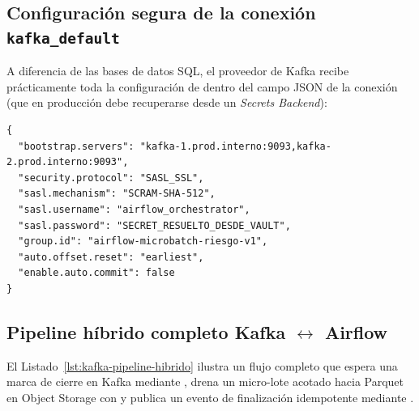 \subsection{Configuración segura de la conexión \texttt{kafka\_default}}

A diferencia de las bases de datos SQL, el proveedor de Kafka recibe prácticamente toda la configuración de  dentro del campo JSON  de la conexión (que en producción debe recuperarse desde un \textit{Secrets Backend}):

\begin{lstlisting}[style=json, caption={Campo \texttt{extra} de una conexión Airflow (\texttt{conn\_type="kafka"}) con autenticación SASL\_SSL.}, label={lst:kafka-conn-extra}]
{
  "bootstrap.servers": "kafka-1.prod.interno:9093,kafka-2.prod.interno:9093",
  "security.protocol": "SASL_SSL",
  "sasl.mechanism": "SCRAM-SHA-512",
  "sasl.username": "airflow_orchestrator",
  "sasl.password": "SECRET_RESUELTO_DESDE_VAULT",
  "group.id": "airflow-microbatch-riesgo-v1",
  "auto.offset.reset": "earliest",
  "enable.auto.commit": false
}
\end{lstlisting}

\subsection{Pipeline híbrido completo Kafka $\leftrightarrow$ Airflow}

El Listado~\ref{lst:kafka-pipeline-hibrido} ilustra un flujo completo que espera una marca de cierre en Kafka mediante , drena un micro-lote acotado hacia Parquet en Object Storage con  y publica un evento de finalización idempotente mediante .

